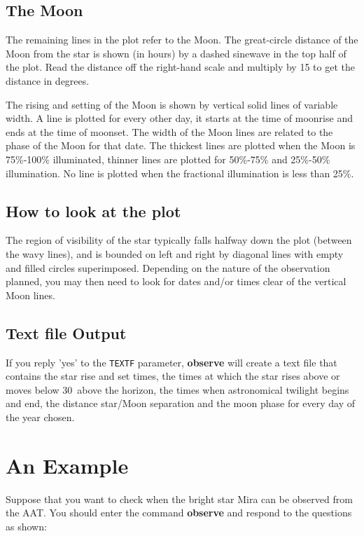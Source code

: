 \subsection{The Moon}

The remaining lines in the plot refer to the Moon. The great-circle
distance of the Moon from the star is shown (in hours) by a dashed
sinewave in the top half of the plot. Read the distance off the
right-hand scale and multiply by 15 to get the distance in degrees.

The rising and setting of the Moon is shown by vertical solid lines of
variable width.  A line is plotted for every other day, it starts at
the time of moonrise and ends at the time of moonset.  The width of the
Moon lines are related to the phase of  the Moon for that date. The
thickest lines are plotted when the Moon is  75\%-100\% illuminated,
thinner lines are plotted for 50\%-75\% and 25\%-50\% illumination. No
line is plotted when the fractional illumination is less than  25\%.

\subsection{How to look at the plot}

The region of visibility of the star typically falls halfway down the
plot (between the wavy lines), and is bounded on left and right by
diagonal lines with empty and filled  circles superimposed. Depending
on the nature of the observation planned, you may then need  to look
for  dates and/or times clear of the vertical Moon lines.

\subsection{Text file Output}

If you reply 'yes' to the {\tt{TEXTF}} parameter, {\bf{observe}} will
create a text file that contains the star rise and set times, the times
at which the star rises above or moves below 30\degrees\ above the
horizon, the times when astronomical twilight begins and end, the
distance star/Moon separation and the moon phase for every day of the
year chosen.

\newpage
\section{An Example}

Suppose that you want to check when the bright star Mira can be
observed  from the AAT.  You should enter the command {\bf{observe}} and
respond to the questions as  shown:

